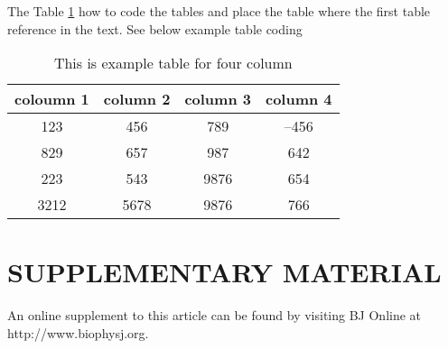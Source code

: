 \documentclass{biophys}
\begin{document}
The Table \ref{tab1} how to code the tables and place the table where the first
table reference in the text. See below example table coding

\begin{table}[!bht]
\begin{center}
\caption{This is example table for four column}\label{tab1}
\begin{tabular}{cccc}\hline
coloumn 1 & column 2 & column 3 & column 4\\ \hline
123 & 456 & 789 & --456\\
829 & 657 & 987 & 642\\
223 & 543 & 9876& 654\\
3212 & 5678 & 9876 & 766\\ \hline
\end{tabular}
\end{center}
\end{table}

\section*{SUPPLEMENTARY MATERIAL}

An online supplement to this article can be found by visiting BJ Online at http://www.biophysj.org.
\end{document}
